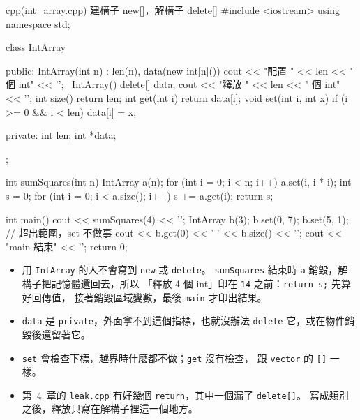 \begin{example}[label=ex:int-array]{cpp}{(int\_array.cpp) 建構子 new[]，解構子 delete[]}
#include <iostream>
using namespace std;

class IntArray {
public:
    IntArray(int n) : len(n), data(new int[n]()) {
        cout << "配置 " << len << " 個 int" << '\n';
    }
    ~IntArray() {
        delete[] data;
        cout << "釋放 " << len << " 個 int" << '\n';
    }
    int size() {
        return len;
    }
    int get(int i) {
        return data[i];
    }
    void set(int i, int x) {
        if (i >= 0 && i < len) {
            data[i] = x;
        }
    }

private:
    int len;
    int *data;
};

int sumSquares(int n) {
    IntArray a(n);
    for (int i = 0; i < n; i++) {
        a.set(i, i * i);
    }
    int s = 0;
    for (int i = 0; i < a.size(); i++) {
        s += a.get(i);
    }
    return s;
}

int main() {
    cout << sumSquares(4) << '\n';
    {
        IntArray b(3);
        b.set(0, 7);
        b.set(5, 1);             // 超出範圍，set 不做事
        cout << b.get(0) << ' ' << b.size() << '\n';
    }
    cout << "main 結束" << '\n';
    return 0;
}
\end{example}


\begin{itemize}
\item 用 \texttt{IntArray} 的人不會寫到 \texttt{new} 或 \texttt{delete}。
\texttt{sumSquares} 結束時 \texttt{a} 銷毀，解構子把記憶體還回去，所以
「釋放 4 個 int」印在 \texttt{14} 之前：\texttt{return s;} 先算好回傳值，
接著銷毀區域變數，最後 \texttt{main} 才印出結果。
\item \texttt{data} 是 \texttt{private}，外面拿不到這個指標，也就沒辦法
\texttt{delete} 它，或在物件銷毀後還留著它。
\item \texttt{set} 會檢查下標，越界時什麼都不做；\texttt{get} 沒有檢查，
跟 \texttt{vector} 的 \texttt{[]} 一樣。
\item 第~4~章的 \texttt{leak.cpp} 有好幾個 \texttt{return}，其中一個漏了
\texttt{delete[]}。 寫成類別之後，釋放只寫在解構子裡這一個地方。
\end{itemize}

